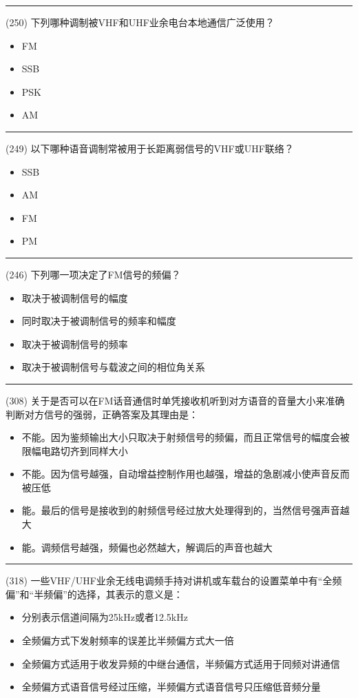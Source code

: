 \documentclass[twocolumn,hyperref,UTF8]{ctexart}  %
\begin{document}
\noindent\rule{0.5\textwidth}{1pt}
\heiti (250) 下列哪种调制被VHF和UHF业余电台本地通信广泛使用？ \songti {\color{gray} [LK1203] }
\begin{itemize}
	\item  FM
	\item  SSB
	\item  PSK
	\item  AM
\end{itemize}


\noindent\rule{0.5\textwidth}{1pt}
\heiti (249) 以下哪种语音调制常被用于长距离弱信号的VHF或UHF联络？ \songti {\color{gray} [LK1202] }
\begin{itemize}
	\item  SSB
	\item  AM
	\item  FM
	\item  PM
\end{itemize}


\noindent\rule{0.5\textwidth}{1pt}
\heiti (246) 下列哪一项决定了FM信号的频偏？ \songti {\color{gray} [LK1100] }
\begin{itemize}
	\item  取决于被调制信号的幅度
	\item  同时取决于被调制信号的频率和幅度
	\item  取决于被调制信号的频率
	\item  取决于被调制信号与载波之间的相位角关系
\end{itemize}


\noindent\rule{0.5\textwidth}{1pt}
\heiti (308) 关于是否可以在FM话音通信时单凭接收机听到对方语音的音量大小来准确判断对方信号的强弱，正确答案及其理由是： \songti {\color{gray} [LK0783] }
\begin{itemize}
	\item  不能。因为鉴频输出大小只取决于射频信号的频偏，而且正常信号的幅度会被限幅电路切齐到同样大小
	\item  不能。因为信号越强，自动增益控制作用也越强，增益的急剧减小使声音反而被压低
	\item  能。最后的信号是接收到的射频信号经过放大处理得到的，当然信号强声音越大
	\item  能。调频信号越强，频偏也必然越大，解调后的声音也越大
\end{itemize}


\noindent\rule{0.5\textwidth}{1pt}
\heiti (318) 一些VHF/UHF业余无线电调频手持对讲机或车载台的设置菜单中有“全频偏”和“半频偏”的选择，其表示的意义是： \songti {\color{gray} [LK1237] }
\begin{itemize}
	\item  分别表示信道间隔为25kHz或者12.5kHz
	\item  全频偏方式下发射频率的误差比半频偏方式大一倍
	\item  全频偏方式适用于收发异频的中继台通信，半频偏方式适用于同频对讲通信
	\item  全频偏方式语音信号经过压缩，半频偏方式语音信号只压缩低音频分量
\end{itemize}
\end{document}
